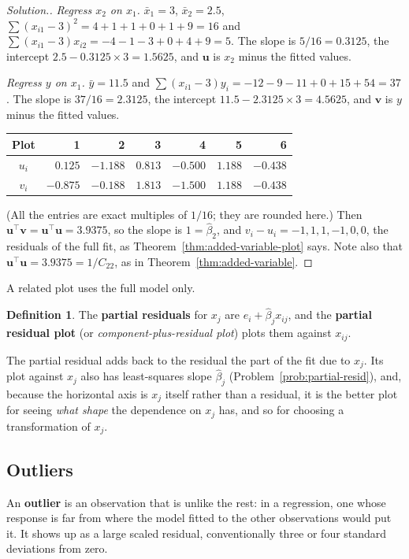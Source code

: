 \documentclass[11pt,a4paper]{article}
\numberwithin{equation}{section}
\theoremstyle{definition}
\newtheorem{defn}[thm]{Definition}
\newenvironment{solution}
  {\renewcommand{\qedsymbol}{}\begin{proof}[\textit{Solution}.]}
  {\end{proof}}
\begin{document}
\begin{solution}
\emph{Regress $x_2$ on $x_1$.} $\bar x_1 = 3$, $\bar x_2 = 2.5$,
$\sum(x_{i1} - 3)^2 = 4 + 1 + 1 + 0 + 1 + 9 = 16$ and
$\sum(x_{i1} - 3)x_{i2} = -4 - 1 - 3 + 0 + 4 + 9 = 5$. The slope is $5/16 = 0.3125$, the
intercept $2.5 - 0.3125 \times 3 = 1.5625$, and $\mathbf{u}$ is $x_2$ minus the fitted values.

\emph{Regress $y$ on $x_1$.} $\bar y = 11.5$ and
$\sum(x_{i1} - 3)y_i = -12 - 9 - 11 + 0 + 15 + 54 = 37$. The slope is $37/16 = 2.3125$, the
intercept $11.5 - 2.3125 \times 3 = 4.5625$, and $\mathbf{v}$ is $y$ minus the fitted values.
\begin{center}
\begin{tabular}{c|rrrrrr}
Plot & 1 & 2 & 3 & 4 & 5 & 6 \\
\hline
$u_i$ & $0.125$ & $-1.188$ & $0.813$ & $-0.500$ & $1.188$ & $-0.438$ \\
$v_i$ & $-0.875$ & $-0.188$ & $1.813$ & $-1.500$ & $1.188$ & $-0.438$ \\
\end{tabular}
\end{center}
(All the entries are exact multiples of $1/16$; they are rounded here.) Then
$\mathbf{u}^\top\mathbf{v} = \mathbf{u}^\top\mathbf{u} = 3.9375$, so the slope is $1 = \hat\beta_2$,
and $v_i - u_i = -1, 1, 1, -1, 0, 0$, the residuals of the full fit, as
Theorem~\ref{thm:added-variable-plot} says. Note also that
$\mathbf{u}^\top\mathbf{u} = 3.9375 = 1/C_{22}$, as in Theorem~\ref{thm:added-variable}.
\end{solution}

A related plot uses the full model only.

\begin{defn}
The \textbf{partial residuals} for $x_j$ are $e_i + \hat\beta_j x_{ij}$, and the
\textbf{partial residual plot} (or \emph{component-plus-residual plot}) plots them against
$x_{ij}$.
\end{defn}

The partial residual adds back to the residual the part of the fit due to $x_j$. Its plot
against $x_j$ also has least-squares slope $\hat\beta_j$ (Problem~\ref{prob:partial-resid}),
and, because the horizontal axis is $x_j$ itself rather than a residual, it is the better
plot for seeing \emph{what shape} the dependence on $x_j$ has, and so for choosing a
transformation of $x_j$.

\subsection{Outliers}
An \textbf{outlier} is an observation that is unlike the rest: in a regression, one whose
response is far from where the model fitted to the other observations would put it. It
shows up as a large scaled residual, conventionally three or four standard deviations from
zero.
\end{document}
